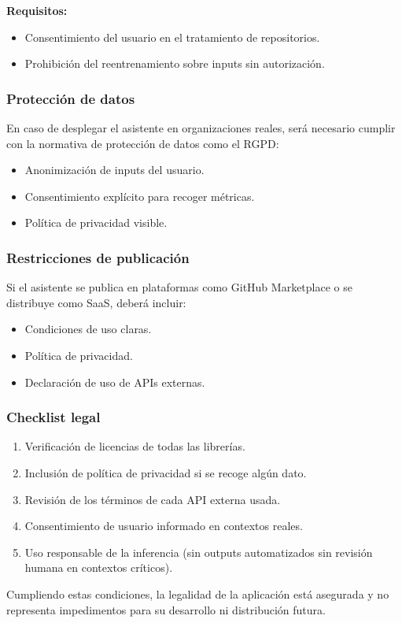 \textbf{Requisitos:}

\begin{itemize}
	\item Consentimiento del usuario en el tratamiento de repositorios.
	\item Prohibición del reentrenamiento sobre inputs sin autorización.
\end{itemize}

\subsubsection{Protección de datos}

En caso de desplegar el asistente en organizaciones reales, será necesario cumplir con la normativa de protección de datos como el RGPD:

\begin{itemize}
	\item Anonimización de inputs del usuario.
	\item Consentimiento explícito para recoger métricas.
	\item Política de privacidad visible.
\end{itemize}

\subsubsection{Restricciones de publicación}

Si el asistente se publica en plataformas como GitHub Marketplace o se distribuye como SaaS, deberá incluir:

\begin{itemize}
	\item Condiciones de uso claras.
	\item Política de privacidad.
	\item Declaración de uso de APIs externas.
\end{itemize}

\subsubsection{Checklist legal}

\begin{enumerate}
	\item Verificación de licencias de todas las librerías.
	\item Inclusión de política de privacidad si se recoge algún dato.
	\item Revisión de los términos de cada API externa usada.
	\item Consentimiento de usuario informado en contextos reales.
	\item Uso responsable de la inferencia (sin outputs automatizados sin revisión humana en contextos críticos).
\end{enumerate}

Cumpliendo estas condiciones, la legalidad de la aplicación está asegurada y no representa impedimentos para su desarrollo ni distribución futura.